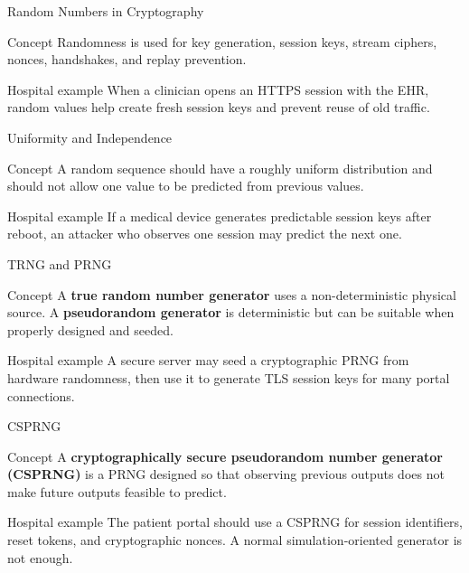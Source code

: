 \documentclass[presentation]{beamer}
\begin{document}
\begin{frame}[c]{Random Numbers in Cryptography}
\begin{block}{Concept}
Randomness is used for key generation, session keys, stream ciphers, nonces, handshakes, and
replay prevention.
\end{block}

\begin{exampleblock}{Hospital example}
When a clinician opens an HTTPS session with the EHR, random values help create fresh session keys
and prevent reuse of old traffic.
\end{exampleblock}
\end{frame}

\begin{frame}[c]{Uniformity and Independence}
\begin{block}{Concept}
A random sequence should have a roughly uniform distribution and should not allow one value to be
predicted from previous values.
\end{block}

\begin{exampleblock}{Hospital example}
If a medical device generates predictable session keys after reboot, an attacker who observes one
session may predict the next one.
\end{exampleblock}
\end{frame}

\begin{frame}[c]{TRNG and PRNG}
\begin{block}{Concept}
A \textbf{true random number generator} uses a non-deterministic physical source. A
\textbf{pseudorandom generator} is deterministic but can be suitable when properly designed and
seeded.
\end{block}

\begin{exampleblock}{Hospital example}
A secure server may seed a cryptographic PRNG from hardware randomness, then use it to generate
TLS session keys for many portal connections.
\end{exampleblock}
\end{frame}

\begin{frame}[c]{CSPRNG}
\begin{block}{Concept}
A \textbf{cryptographically secure pseudorandom number generator (CSPRNG)} is a PRNG designed so
that observing previous outputs does not make future outputs feasible to predict.
\end{block}

\begin{exampleblock}{Hospital example}
The patient portal should use a CSPRNG for session identifiers, reset tokens, and cryptographic
nonces. A normal simulation-oriented generator is not enough.
\end{exampleblock}
\end{frame}
\end{document}
